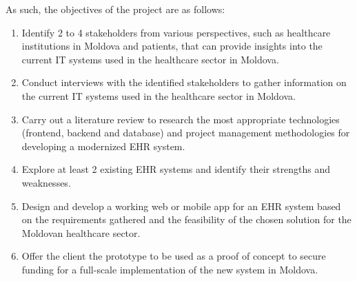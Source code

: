 As such, the objectives of the project are as follows:
\begin{enumerate}   
    \item Identify 2 to 4 stakeholders from various perspectives, such as healthcare institutions in Moldova and patients, that can provide insights into the current IT systems used in the healthcare sector in Moldova.
    \item Conduct interviews with the identified stakeholders to gather information on the current IT systems used in the healthcare sector in Moldova.
    \item Carry out a literature review to research the most appropriate technologies (frontend, backend and database) and project management methodologies for developing a modernized EHR system.
    \item Explore at least 2 existing EHR systems and identify their strengths and weaknesses.
    \item Design and develop a working web or mobile app for an EHR system based on the requirements gathered and the feasibility of the chosen solution for the Moldovan healthcare sector.
    \item Offer the client the prototype to be used as a proof of concept to secure funding for a full-scale implementation of the new system in Moldova.
\end{enumerate}